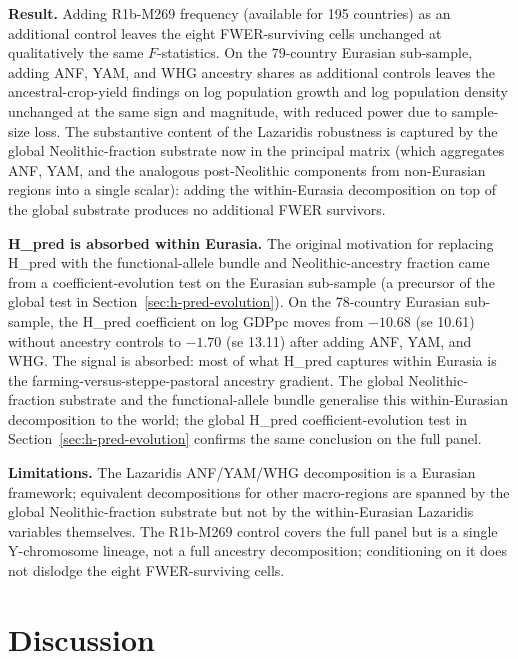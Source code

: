 \documentclass[11pt,letterpaper]{article}
\begin{document}
\textbf{Result.} Adding R1b-M269 frequency (available for 195 countries) as an additional control leaves the eight FWER-surviving cells unchanged at qualitatively the same $F$-statistics. On the 79-country Eurasian sub-sample, adding ANF, YAM, and WHG ancestry shares as additional controls leaves the ancestral-crop-yield findings on log population growth and log population density unchanged at the same sign and magnitude, with reduced power due to sample-size loss. The substantive content of the Lazaridis robustness is captured by the global Neolithic-fraction substrate now in the principal matrix (which aggregates ANF, YAM, and the analogous post-Neolithic components from non-Eurasian regions into a single scalar): adding the within-Eurasia decomposition on top of the global substrate produces no additional FWER survivors.

\textbf{H\_pred is absorbed within Eurasia.} The original motivation for replacing H\_pred with the functional-allele bundle and Neolithic-ancestry fraction came from a coefficient-evolution test on the Eurasian sub-sample (a precursor of the global test in Section~\ref{sec:h-pred-evolution}). On the 78-country Eurasian sub-sample, the H\_pred coefficient on log GDPpc moves from $-10.68$ (se 10.61) without ancestry controls to $-1.70$ (se 13.11) after adding ANF, YAM, and WHG. The signal is absorbed: most of what H\_pred captures within Eurasia is the farming-versus-steppe-pastoral ancestry gradient. The global Neolithic-fraction substrate and the functional-allele bundle generalise this within-Eurasian decomposition to the world; the global H\_pred coefficient-evolution test in Section~\ref{sec:h-pred-evolution} confirms the same conclusion on the full panel.

\textbf{Limitations.}
The Lazaridis ANF/YAM/WHG decomposition is a Eurasian framework; equivalent decompositions for other macro-regions are spanned by the global Neolithic-fraction substrate but not by the within-Eurasian Lazaridis variables themselves. The R1b-M269 control covers the full panel but is a single Y-chromosome lineage, not a full ancestry decomposition; conditioning on it does not dislodge the eight FWER-surviving cells.

\section{Discussion}
\label{sec:discussion}
\end{document}
